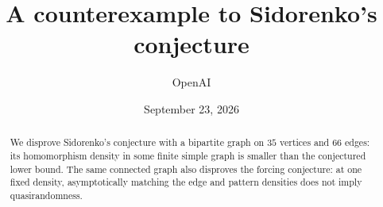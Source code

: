 \documentclass[11pt]{article}
\title{A counterexample to Sidorenko's conjecture}
\author{OpenAI}
\date{September 23, 2026}
\begin{document}
\maketitle
\begin{abstract}
We disprove Sidorenko's conjecture with a bipartite graph on \(35\) vertices
and \(66\) edges: its homomorphism density in some finite simple graph is
smaller than the conjectured lower bound. The same connected graph also
disproves the forcing conjecture: at one fixed density, asymptotically
matching the edge and pattern densities does not imply quasirandomness.
\end{abstract}
\tableofcontents












\end{document}
